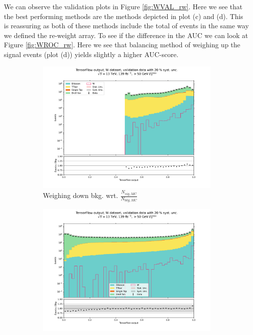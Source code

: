 \documentclass[12pt, a4paper]{book}
\begin{document}
\clearpage
\noindent We can observe the validation plots in Figure \ref{fig:WVAL_rw}. Here we see that the best performing methods are the methods depicted in plot (c) and (d). This is reassuring as both of these methods include the total of events in the same way we defined the re-weight array. 
To see if the difference in the AUC we can look at Figure \ref{fig:WROC_rw}. Here we see that balancing method of weighing up the signal events (plot (d)) yields slightly a higher AUC-score.\\ 
\begin{figure}[!ht]
	\centering
	\begin{subfigure}[b]{0.49\textwidth}
        \centering
        \includegraphics[width=1\textwidth]{bkg_MC/VAL.pdf}
        \caption{Weighing down bkg. wrt. $\frac{N_{sig,MC}}{N_{bkg,MC}}$ }
     \end{subfigure}
     \hfill
     \begin{subfigure}[b]{0.49\textwidth}
        \centering
        \includegraphics[width=1\textwidth]{sig_MC/VAL.pdf}

\end{subfigure}
\end{figure}
\end{document}
